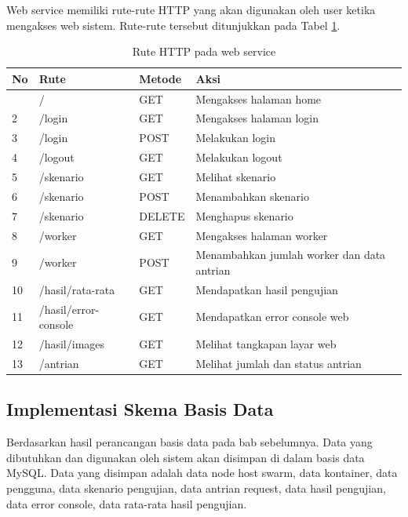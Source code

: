 			\indent Web service memiliki rute-rute HTTP yang akan digunakan oleh user ketika mengakses web sistem. Rute-rute tersebut ditunjukkan pada Tabel \ref{tabelruteweb}.
			\begin{longtable}{|p{}|p{}|p{0.30\textwidth}|p{}|}
				\caption{Rute HTTP pada web service} \label{tabelruteweb} \\
				\hline
				\textbf{No} & \textbf{Rute} & \textbf{Metode} & \textbf{Aksi} \\ \hline
				\endhead
				\endfoot
				\endlastfoot
				1 & / & GET & Mengakses halaman home \\ \hline
				2 & /login & GET & Mengakses halaman login \\ \hline
				3 & /login & POST & Melakukan login \\ \hline
				4 & /logout & GET & Melakukan logout \\ \hline
				5 & /skenario & GET & Melihat skenario \\ \hline
				6 & /skenario & POST & Menambahkan skenario \\ \hline
				7 & /skenario & DELETE & Menghapus skenario \\ \hline
				8 & /worker & GET & Mengakses halaman worker \\ \hline
				9 & /worker & POST & Menambahkan jumlah worker dan data antrian \\ \hline
				10 & /hasil/rata-rata & GET & Mendapatkan hasil pengujian \\ \hline
				11 & /hasil/error-console & GET & Mendapatkan error console web \\ \hline
				12 & /hasil/images & GET & Melihat tangkapan layar web \\ \hline
				13 & /antrian & GET & Melihat jumlah dan status antrian \\ \hline
				
			\end{longtable}
		
		\subsection{Implementasi Skema Basis Data}
			Berdasarkan hasil perancangan basis data pada bab sebelumnya. Data yang dibutuhkan dan digunakan oleh sistem akan disimpan di dalam basis data MySQL. Data yang disimpan adalah data node host swarm, data kontainer, data pengguna, data skenario pengujian, data antrian request, data hasil pengujian, data error console, data rata-rata hasil pengujian.
			
